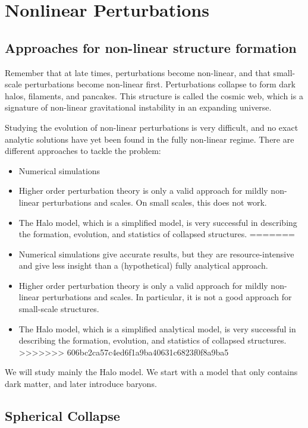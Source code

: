 \chapter{Nonlinear Perturbations}

\section{Approaches for non-linear structure formation}

Remember that at late times, perturbations become non-linear, and that small-scale perturbations become non-linear first.
Perturbations collapse to form dark halos, filaments, and pancakes.
This structure is called the cosmic web, which is a signature of non-linear gravitational instability in an expanding universe.

Studying the evolution of non-linear perturbations is very difficult, and no exact analytic solutions have yet been found in the fully non-linear regime.
There are different approaches to tackle the problem:
\begin{itemize}
	\item Numerical simulations
	\item Higher order perturbation theory is only a valid approach for mildly non-linear perturbations and scales.
	On small scales, this does not work.
	\item The Halo model, which is a simplified model, is very successful in describing the formation, evolution, and statistics of collapsed structures.
=======
	\item Numerical simulations give accurate results, but they are resource-intensive and give less insight than a (hypothetical) fully analytical approach.
	\item Higher order perturbation theory is only a valid approach for mildly non-linear perturbations and scales.
	In particular, it is not a good approach for small-scale structures.
	\item The Halo model, which is a simplified analytical model, is very successful in describing the formation, evolution, and statistics of collapsed structures.
>>>>>>> 606bc2ca57c4ed6f1a9ba40631c6823f0f8a9ba5
\end{itemize}

We will study mainly the Halo model. We start with a model that only contains dark matter, and later introduce baryons.

\section{Spherical Collapse}

